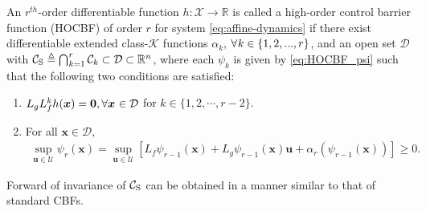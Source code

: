 \begin{definition} \label{def: hocbf}
    An $r^{th}$-order differentiable function $h : \mathcal{X} \rightarrow \mathbb{R}$ is called a high-order control barrier function (HOCBF) of order $r$ for system \eqref{eq:affine-dynamics} if there exist differentiable extended class-$\mathcal{K}$ functions $\alpha_k$, $\forall \nspace{1} k \in \{1,2,...,r\}$, and an open set $\mathcal{D}$ with $\mathcal{C}_{\rm S} \triangleq \bigcap^{\nspace{1}r}_{\nspace{1}k=1} \mathcal{C}_{k} \subset \mathcal{D} \subset \mathbb{R}^n$, where each $\psi_k$ is given by \eqref{eq:HOCBF_psi} such that the following two conditions are satisfied:
    \begin{enumerate}
        \item $L_g L^{k}_f h(\boldsymbol{x}) = \boldsymbol{0}, \forall \boldsymbol{x} \nspace{1}\in \mathcal{D}$ for $k \in \{ 1,2,\cdots,r - 2\}$.
        \item For all $\boldsymbol{x} \in \mathcal{D},$
            \begin{align}
               \sup_{\boldsymbol{u} \in \mathcal{U}} \psi_r (\boldsymbol{x})  = 
               \sup_{\boldsymbol{u} \in \mathcal{U}} \left[L_f \psi_{r-1}(\boldsymbol{x}) + L_g \psi_{r-1} (\boldsymbol{x}) \boldsymbol{u} + \alpha_r(\psi_{r-1}(\boldsymbol{x}))\right] \geq 0.
            \end{align}
    \end{enumerate}
\end{definition}
Forward of invariance of $\mathcal{C}_{\rm S}$ can be obtained in a manner similar to that of standard CBFs.

